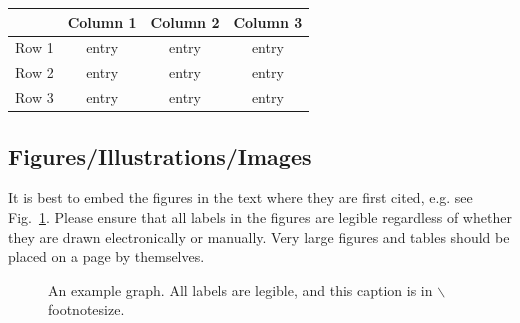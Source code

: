 \documentclass{evolang11}
\begin{document}
\begin{table}[ht]
{\footnotesize
\begin{tabular}{@{}cccc@{}}
\hline
 & Column 1 & Column 2 & Column 3\\
\hline
Row 1 & entry & entry & entry \\
Row 2 & entry & entry & entry \\
Row 3 & entry & entry & entry \\

\hline
\end{tabular}\label{table1}}
\end{table}


\subsection{Figures/Illustrations/Images}

It is best to embed the figures in the text where they are first cited,
e.g. see Fig.~\ref{inter}. Please ensure that all labels in the
figures are legible regardless of whether they are drawn electronically or manually.  Very large figures and tables should be placed
on a page by themselves.


\begin{figure}[ht]
\begin{center}
\end{center}
\caption{{\footnotesize An example graph.  All labels are legible, and
    this caption is in $\backslash$footnotesize. \label{inter}}}
\end{figure}
\end{document}
